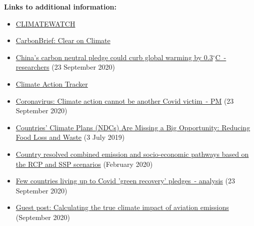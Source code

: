 \documentclass[12pt]{article}
\begin{document}
 \noindent \textbf{Links to additional information:}
 \begin{itemize}
 \item \href{https://www.climatewatchdata.org/}{CLIMATEWATCH} 
 \vspace{-.2cm} \item \href{https://www.carbonbrief.org/}{CarbonBrief: Clear on Climate} 
 \vspace{-.2cm} \item \href{https://uk.reuters.com/article/us-climate-change-china/chinas-carbon-neutral-pledge-could-curb-global-warming-by-0-3c-researchers-idUKKCN26E325?utm_campaign=Carbon%20Brief%20Daily%20Briefing&utm_medium=email&utm_source=Revue%20newsletter}{China's carbon neutral pledge could curb global warming by 0.3$^{\circ}$C~- researchers} (23 September 2020)
 \vspace{-.2cm} \item \href{https://climateactiontracker.org/}{Climate Action Tracker} 
 \vspace{-.2cm} \item \href{https://www.bbc.com/news/science-environment-54274644?utm_campaign=Carbon%20Brief%20Daily%20Briefing&utm_medium=email&utm_source=Revue%20newsletter}{Coronavirus: Climate action cannot be another Covid victim~- PM} (23 September 2020)
 \vspace{-.2cm} \item \href{https://www.wri.org/blog/2019/07/countries-climate-plans-ndcs-are-missing-big-opportunity-reducing-food-loss-and-waste}{Countries' Climate Plans (NDCs) Are Missing a Big Opportunity: Reducing Food Loss and Waste} (3 July 2019)
 \vspace{-.2cm} \item \href{https://zenodo.org/record/3638137#.X2sqPIuxU2w}{Country resolved combined emission and socio-economic pathways based on the RCP and SSP scenarios} (February 2020)
 \vspace{-.2cm} \item \href{https://www.theguardian.com/environment/2020/sep/23/few-countries-living-up-to-green-recovery-promises-analysis?utm_campaign=Carbon%20Brief%20Daily%20Briefing&utm_medium=email&utm_source=Revue%20newsletter}{Few countries living up to Covid 'green recovery' pledges~- analysis} (23 September 2020)
 \vspace{-.2cm} \item \href{https://www.carbonbrief.org/guest-post-calculating-the-true-climate-impact-of-aviation-emissions?utm_campaign=Carbon%20Brief%20Daily%20Briefing&utm_medium=email&utm_source=Revue%20newsletter}{Guest post: Calculating the true climate impact of aviation emissions} (September 2020)

\end{itemize}
\end{document}
